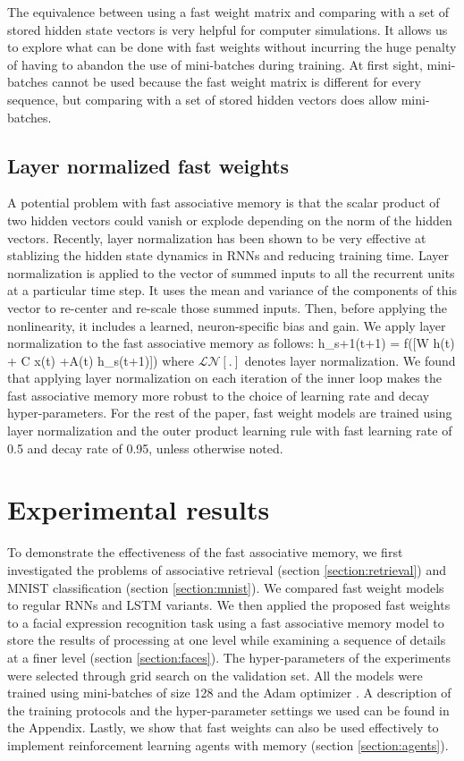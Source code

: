 \documentclass{article}
\begin{document}
The equivalence between using a fast weight matrix and comparing with a set of stored hidden state vectors is very helpful for computer simulations.  It allows us to explore what can be done with fast weights without incurring the huge penalty of having to abandon the use of mini-batches during training. At first sight, mini-batches cannot be used because the fast weight matrix is different for every sequence, but comparing with a set of stored hidden vectors does allow mini-batches. 

\subsection{Layer normalized fast weights}
A potential problem with fast associative memory is that the scalar product of two hidden vectors could vanish or explode depending on the norm of the hidden vectors.  Recently, layer normalization \citep{ln} has been shown to be very effective at stablizing the hidden state dynamics in RNNs and reducing training time.  Layer normalization is applied to the vector of summed inputs to all the recurrent units at a particular time step. It uses the mean and variance of the components of this vector to re-center and re-scale  those summed inputs. Then,  before applying the nonlinearity,  it includes a learned, neuron-specific bias and gain.  We apply layer normalization to the fast associative memory as follows: 
\bea h_{s+1}(t+1) = f([W h(t) + C x(t) +A(t) h_s(t+1)]) \eea 
where $\mathcal{LN}[.]$ denotes layer normalization. We found that applying layer normalization on each iteration of the inner loop makes the fast associative memory more robust to the choice of learning rate and decay hyper-parameters. For the rest of the paper, fast weight models are trained using layer normalization and the outer product learning rule with fast learning rate of 0.5 and decay rate of 0.95, unless otherwise noted.

\section{Experimental results}
To demonstrate the effectiveness of the fast associative memory, we first investigated the problems of associative retrieval (section \ref{section:retrieval}) and MNIST classification (section \ref{section:mnist}). We compared fast weight models to regular RNNs and LSTM variants. We then applied the proposed fast weights to a facial expression recognition task using a  fast associative memory model to store the results of processing at one level while examining a sequence of details at a finer level (section \ref{section:faces}). The hyper-parameters of the experiments were selected through grid search on the validation set. All the models were trained using mini-batches of size 128 and the Adam optimizer \citep{adam}. A description of the training protocols and the hyper-parameter settings we used can be found in the Appendix. Lastly, we show that fast weights can also be used effectively to implement reinforcement learning agents with memory (section \ref{section:agents}). 
\end{document}
